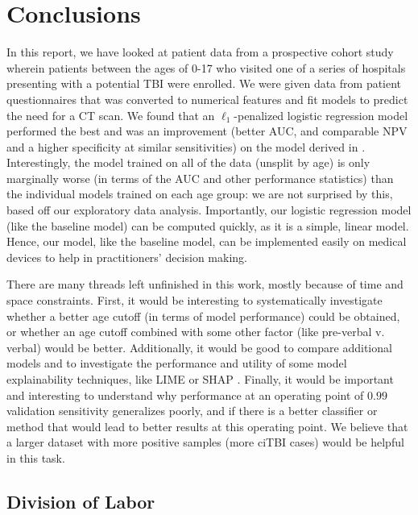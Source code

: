 \documentclass[11pt, letterpaper]{amsart}
\let\Oldsection\section
\renewcommand{\section}{\FloatBarrier\Oldsection}
\let\Oldsubsection\subsection
\renewcommand{\subsection}{\FloatBarrier\Oldsubsection}
\begin{document}
\section{Conclusions} \label{sec:conclusions}

In this report, we have looked at patient data from a prospective cohort study wherein patients between the ages of 0-17 who visited one of a series of hospitals presenting with a potential TBI were enrolled. We were given data from patient questionnaires that was converted to numerical features and fit models to predict the need for a CT scan. We found that an $\ell_1$-penalized logistic regression model performed the best and was an improvement (better AUC, and comparable NPV and a higher specificity at similar sensitivities) on the model derived in \cite{kuppermann2009identification}. Interestingly, the model trained on all of the data (unsplit by age) is only marginally worse (in terms of the AUC and other performance statistics) than the individual models trained on each age group: we are not surprised by this, based off our exploratory data analysis. Importantly, our logistic regression model (like the baseline model) can be computed quickly, as it is a simple, linear model. Hence, our model, like the baseline model, can be implemented easily on medical devices to help in practitioners' decision making. 

There are many threads left unfinished in this work, mostly because of time and space constraints. First, it would be interesting to systematically investigate whether a better age cutoff (in terms of model performance) could be obtained, or whether an age cutoff combined with some other factor (like pre-verbal v. verbal) would be better. Additionally, it would be good to compare additional models and to investigate the performance and utility of some model explainability techniques, like LIME \cite{ribeiro2016should} or SHAP \cite{vstrumbelj2014explaining}. Finally, it would be important and interesting to understand why performance at an operating point of $0.99$ validation sensitivity generalizes poorly, and if there is a better classifier or method that would lead to better results at this operating point. We believe that a larger dataset with more positive samples (more ciTBI cases) would be helpful in this task. 

\subsection{Division of Labor}
\end{document}
